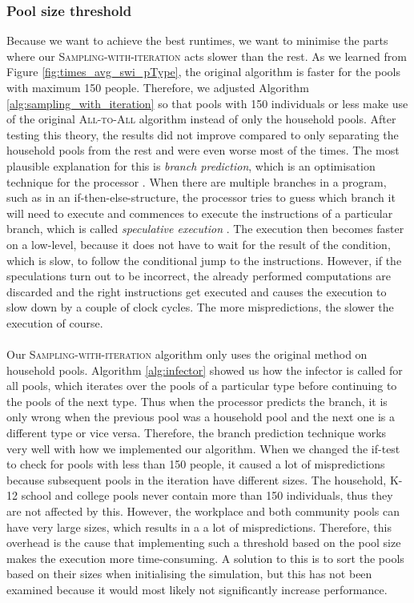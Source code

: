 \subsubsection{Pool size threshold}
Because we want to achieve the best runtimes, we want to minimise the parts where our \textsc{Sampling-with-iteration} acts slower than the rest. As we learned from Figure \ref{fig:times_avg_swi_pType}, the original algorithm is faster for the pools with maximum 150 people. Therefore, we adjusted Algorithm \ref{alg:sampling_with_iteration} so that pools with 150 individuals or less make use of the original \textsc{All-to-All} algorithm instead of only the household pools. After testing this theory, the results did not improve compared to only separating the household pools from the rest and were even worse most of the times. The most plausible explanation for this is \textit{branch prediction}, which is an optimisation technique for the processor \cite{branch_prediction}. When there are multiple branches in a program, such as in an if-then-else-structure, the processor tries to guess which branch it will need to execute and commences to execute the instructions of a particular branch, which is called \textit{speculative execution} \cite{speculative_execution}. The execution then becomes faster on a low-level, because it does not have to wait for the result of the condition, which is slow, to follow the conditional jump to the instructions. However, if the speculations turn out to be incorrect, the already performed computations are discarded and the right instructions get executed and causes the execution to slow down by a couple of clock cycles. The more mispredictions, the slower the execution of course. 
\\\\
Our \textsc{Sampling-with-iteration} algorithm only uses the original method on household pools. Algorithm \ref{alg:infector} showed us how the infector is called for all pools, which iterates over the pools of a particular type before continuing to the pools of the next type. Thus when the processor predicts the branch, it is only wrong when the previous pool was a household pool and the next one is a different type or vice versa. Therefore, the branch prediction technique works very well with how we implemented our algorithm. When we changed the if-test to check for pools with less than 150 people, it caused a lot of mispredictions because subsequent pools in the iteration have different sizes. The household, K-12 school and college pools never contain more than 150 individuals, thus they are not affected by this. However, the workplace and both community pools can have very large sizes, which results in a a lot of mispredictions. Therefore, this overhead is the cause that implementing such a threshold based on the pool size makes the execution more time-consuming. A solution to this is to sort the pools based on their sizes when initialising the simulation, but this has not been examined because it would most likely not significantly increase performance.

